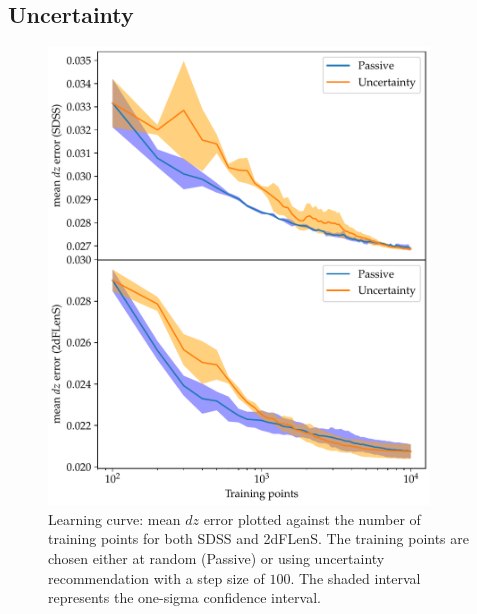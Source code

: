 \documentclass[11pt,twoside,openright]{report}
\begin{document}
\subsection{Uncertainty}
  \begin{figure}
    \centering
    \includegraphics[width=0.9\textwidth]{uncertainty_dz1.pdf}
    \caption{Learning curve: mean $dz$ error plotted against the number of training points for both SDSS and 2dFLenS. The training points are chosen either at random (Passive) or using uncertainty recommendation with a step size of $100$. The shaded interval represents the one-sigma confidence interval.}
    \label{fig:uncertainty_dz1}
  \end{figure}
\end{document}
